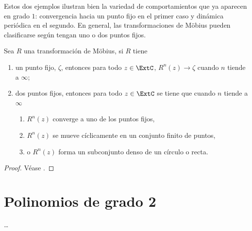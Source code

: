 Estos dos ejemplos ilustran bien la variedad de comportamientos que ya aparecen
en grado $1$: convergencia hacia un punto fijo en el primer caso y dinámica
periódica en el segundo. En general, las transformaciones de Möbius pueden
clasificarse según tengan uno o dos puntos fijos.

\begin{teorema}
Sea $R$ una transformación de Möbius, si $R$ tiene
\begin{enumerate}
    \item un punto fijo, $\zeta$, entonces para todo $z \in \ExtC$,
        $R^n(z) \to \zeta$ cuando $n$ tiende a $\infty$;
    \item dos puntos fijos, entonces para todo $z \in \ExtC$ se tiene que cuando
        $n$ tiende a $\infty$
    \begin{enumerate}
        \item $R^n(z)$ converge a uno de los puntos fijos,
        \item $R^n(z)$ se mueve cíclicamente en un conjunto finito de puntos,
        \item o $R^n(z)$ forma un subconjunto denso de un círculo o recta.
    \end{enumerate}
\end{enumerate}
\end{teorema}

\begin{proof}
    Véase \cite[4--5]{Beardon1991}.
\end{proof}

\section{Polinomios de grado 2}

\ldots


